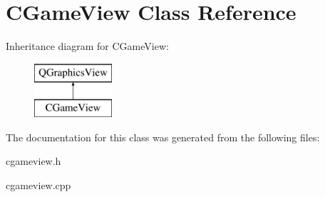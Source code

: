 \hypertarget{class_c_game_view}{}\section{C\+Game\+View Class Reference}
\label{class_c_game_view}
Inheritance diagram for C\+Game\+View\+:\begin{figure}[H]
\begin{center}
\leavevmode
\includegraphics[height=2.000000cm]{class_c_game_view}
\end{center}
\end{figure}


The documentation for this class was generated from the following files\+:\begin{DoxyCompactItemize}
\item 
cgameview.\+h\item 
cgameview.\+cpp\end{DoxyCompactItemize}
